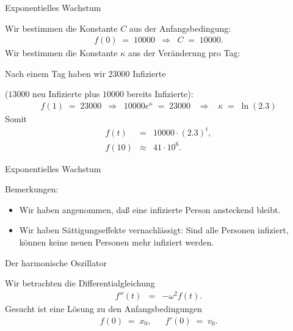 \documentclass[german]{beamer}
\newcommand{\bq}{\begin{eqnarray*}}
\newcommand{\eq}{\end{eqnarray*}}
\begin{document}
\begin{frame}{Exponentielles Wachstum}

Wir bestimmen die Konstante $C$ aus der Anfangsbedingung:
\bq
 f\left(0\right) \; = \; 10000
 & \Rightarrow &
 C \; = \; 10000.
\eq
Wir bestimmen die Konstante $\kappa$ aus der Ver\"anderung pro Tag: 

Nach einem Tag haben wir $23000$ Infizierte 

($13000$ neu Infizierte plus $10000$ bereits Infizierte):
\bq
 f\left(1\right) \; = \; 23000
 & \Rightarrow &
 10000 e^\kappa \; = \; 23000
 \;\;\; \Rightarrow \;\;\;
 \kappa \; = \; \ln\left(2.3\right)
\eq
Somit
\bq
 f\left(t\right) 
 & = & 
 10000 \cdot \left(2.3\right)^t,
 \nonumber \\
 f\left(10\right)
 & \approx &
 41 \cdot 10^6.
\eq

\end{frame}

\begin{frame}{Exponentielles Wachstum}

Bemerkungen:
\begin{itemize}
\item Wir haben angenommen, da{\ss} eine infizierte Person ansteckend bleibt.
\item Wir haben S\"attigungseffekte vernachl\"assigt: Sind alle Personen infiziert, k\"onnen keine neuen Personen mehr infiziert werden.
\end{itemize}

\end{frame}

\begin{frame}{Der harmonische Oszillator}

\begin{example}
Wir betrachten die Differentialgleichung
\bq
 f''(t) & = & - \omega^2 f(t).
\eq
Gesucht ist eine L\"osung zu den Anfangsbedingungen
\bq
 f(0) \; = \; x_0,
 & &
 f'(0) \; = \; v_0.
\eq
\end{example}

\end{frame}
\end{document}
